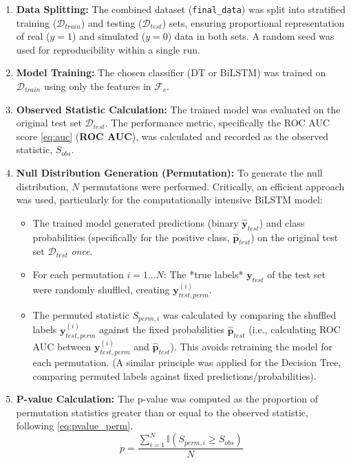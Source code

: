 \begin{enumerate}
  \item \textbf{Data Splitting:} The combined dataset (\texttt{final\_data}) was split into stratified training ($\mathcal{D}_{train}$) and testing ($\mathcal{D}_{test}$) sets, ensuring proportional representation of real ($y=1$) and simulated ($y=0$) data in both sets. A random seed was used for reproducibility within a single run.
  \item \textbf{Model Training:} The chosen classifier (DT or BiLSTM) was trained on $\mathcal{D}_{train}$ using only the features in $\mathcal{F}_c$.
  \item \textbf{Observed Statistic Calculation:} The trained model was evaluated on the original test set $\mathcal{D}_{test}$. The performance metric, specifically the ROC AUC score \autoref{eq:auc} (\textbf{ROC AUC}), was calculated and recorded as the observed statistic, $S_{obs}$.
  \item \textbf{Null Distribution Generation (Permutation):} To generate the null distribution, $N$ permutations were performed. Critically, an efficient approach was used, particularly for the computationally intensive BiLSTM model:
        \begin{itemize}
          \item The trained model generated predictions (binary $\hat{\mathbf{y}}_{test}$) and class probabilities (specifically for the positive class, $\hat{\mathbf{p}}_{test}$) on the original test set $\mathcal{D}_{test}$ \textit{once}.
          \item For each permutation $i=1...N$: The *true labels* $\mathbf{y}_{test}$ of the test set were randomly shuffled, creating $\mathbf{y}_{test, perm}^{(i)}$.
          \item The permuted statistic $S_{perm, i}$ was calculated by comparing the shuffled labels $\mathbf{y}_{test, perm}^{(i)}$ against the fixed probabilities $\hat{\mathbf{p}}_{test}$ (i.e., calculating ROC AUC between $\mathbf{y}_{test, perm}^{(i)}$ and $\hat{\mathbf{p}}_{test}$). This avoids retraining the model for each permutation. (A similar principle was applied for the Decision Tree, comparing permuted labels against fixed predictions/probabilities).
        \end{itemize}
  \item \textbf{P-value Calculation:} The p-value was computed as the proportion of permutation statistics greater than or equal to the observed statistic, following \autoref{eq:pvalue_perm}.
        \begin{equation}
          p = \frac{\sum_{i=1}^{N} \mathbb{I}(S_{perm, i} \ge S_{obs})}{N}
          \nonumber
        \end{equation}
\end{enumerate}

